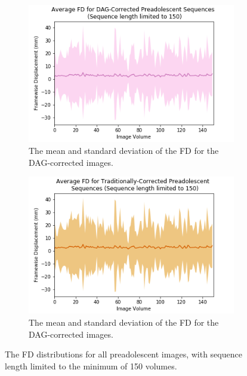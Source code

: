 \begin{figure}[t]
	\begin{subfigure}{0.45\textwidth}
		\centering
		\includegraphics[width=1\textwidth]{6/figures/pread-dag-fd-150.png}
		\caption{The mean and standard deviation of the FD for the DAG-corrected images.}
	\end{subfigure}%
	\vspace{0.05\textwidth}
	\begin{subfigure}{0.45\textwidth}
		\centering
		\includegraphics[width=1\textwidth]{6/figures/pread-trad-fd-150.png}
		\caption{The mean and standard deviation of the FD for the DAG-corrected images.}
	\end{subfigure}
\caption{The FD distributions for all preadolescent images, with sequence length limited to the minimum of 150 volumes.}
\label{fig:pread-fd-150}
\end{figure}

